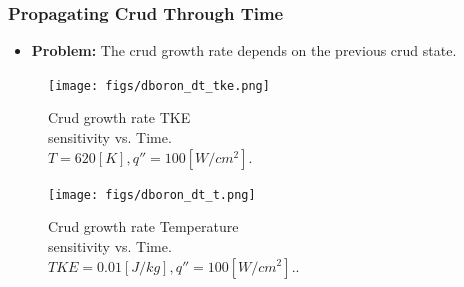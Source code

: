 \documentclass[t, pdftex]{beamer}
\begin{document}
\begin{frame}[shrink=10]
\frametitle{Propagating Crud Through Time}
\begin{itemize}
\item  \textbf{Problem:}  The crud growth rate depends on the previous crud state. 
\end{itemize}
\begin{figure}[!htbp]
\centering
\begin{minipage}{.5\textwidth}
  \texttt{[image: figs/dboron\_dt\_tke.png]}
\caption{\centering Crud growth rate TKE \\ sensitivity vs. Time. \\ $T=620[K], q''=100[W/cm^2]$.} 
\label{fig:crud_pre_map}
\end{minipage}%
\begin{minipage}{.5\textwidth}
  \texttt{[image: figs/dboron\_dt\_t.png]}
\caption{\centering Crud growth rate Temperature \\ sensitivity vs. Time. \\ $TKE=0.01[J/kg], q''=100[W/cm^2]$..}
\label{fig:crud_post_map}
\end{minipage}
\end{figure}
\end{frame}
\end{document}
